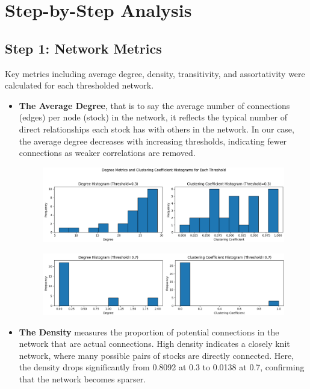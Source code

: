 \documentclass[12pt]{article}
\begin{document}
\section{Step-by-Step Analysis}

\subsection{Step 1: Network Metrics}
Key metrics including average degree, density, transitivity, and assortativity were calculated for each thresholded network.

\begin{itemize}
    \item \textbf{The Average Degree}, that is to say the average number of connections (edges) per node (stock) in the network, it reflects the typical number of direct relationships each stock has with others in the network. In our case, the average degree decreases with increasing thresholds, indicating fewer connections as weaker correlations are removed.
    \begin{figure}[H]
        \centering
        \includegraphics[width=\textwidth]{degree_cluster_coeff_network_stock_corr3.png}
        \label{fig:degree_clustering_03}
    \end{figure}
    \begin{figure}[H]
        \centering
        \includegraphics[width=\textwidth]{degree_cluster_coeff_network_stock_corr7.png}
        \label{fig:degree_clustering_07}
    \end{figure}
    \item \textbf{The Density} measures the proportion of potential connections in the network that are actual connections. High density indicates a closely knit network, where many possible pairs of stocks are directly connected.  Here, the density drops significantly from 0.8092 at 0.3 to 0.0138 at 0.7, confirming that the network becomes sparser.

\end{itemize}
\end{document}
